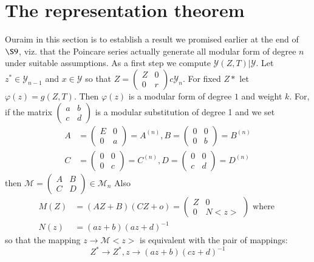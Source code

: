 

\chapter{The representation theorem} %

Our\pageoriginale  aim in this section is to establish a result we
promised earlier 
at the end of $\S 9$, viz. that the Poincare series actually generate
all modular form of degree $n$ under suitable assumptions. As a first
step we compute $\mathscr{Y}(Z, T) | \mathscr{Y}$. Let $z^* \in
\mathscr{Y}_{n - 1}$ and $x \in \mathscr{Y}$ so that $Z
= \begin{pmatrix} Z &  0 \\ 0 & r \end{pmatrix} c \mathscr{Y}_n$. For
fixed $Z*$ let $\varphi (z) = g (Z, T)$. Then $\varphi (z)$ is a
modular form of degree $1$ and weight $k$. For, if the matrix
$\begin{pmatrix} a & b \\ c & d \end{pmatrix}$ is a modular
substitution of degree 1 and we set  
\begin{align*}
A & = 
\begin{pmatrix}
E & 0\\
0 & a
\end{pmatrix}
 = A^{(n)}, B  = 
\begin{pmatrix}
0 & 0\\
0 & b
\end{pmatrix}
= B^{(n)}\\
C & = 
\begin{pmatrix}
0 & 0\\
0 & c
\end{pmatrix}
= C^{(n)}, D =
\begin{pmatrix}
0 & 0\\
c & d
\end{pmatrix}
= D^{(n)}
\end{align*}
 then $\mathcal{M} = \begin{pmatrix} A  & B \\ C & D \end{pmatrix} \in
 \mathcal{M}_n$ Also 
 \begin{align*}
M (Z) & = (AZ + B) (CZ + o) = \begin{pmatrix} Z & 0 \\ 0 & N
  <z> \end{pmatrix} \text { where } \tag{177}\label{eq177}\\ 
N(z) & = (az + b)(az + d)^{-1}
 \end{align*} 
 so that the mapping $z \to \mathcal{M}<z>$ is equivalent with the
 pair of mappings: 
$$
Z^* \to Z^*, z \to (az + b) (cz +d )^{-1} 
$$

